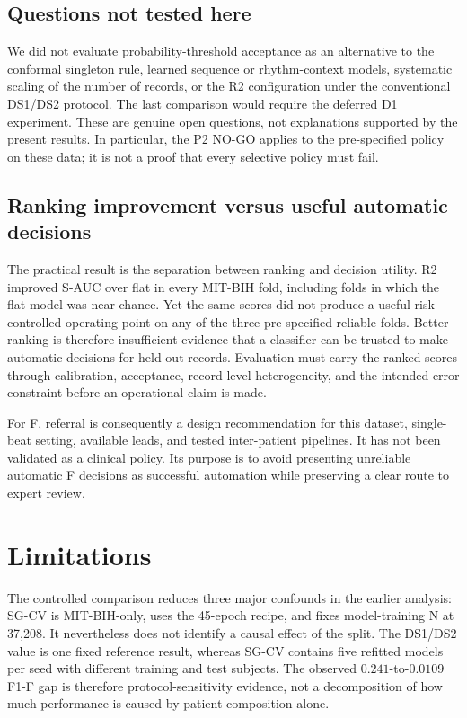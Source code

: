 \documentclass[review,12pt]{elsarticle}
\begin{document}
\subsection{Questions not tested here}
We did not evaluate probability-threshold acceptance as an alternative to the
conformal singleton rule, learned sequence or rhythm-context models, systematic
scaling of the number of records, or the R2 configuration under the conventional
DS1/DS2 protocol. The last comparison would require the deferred D1 experiment.
These are genuine open questions, not explanations supported by the present
results. In particular, the P2 NO-GO applies to the pre-specified policy on
these data; it is not a proof that every selective policy must fail.

\subsection{Ranking improvement versus useful automatic decisions}
The practical result is the separation between ranking and decision utility.
R2 improved S-AUC over flat in every MIT-BIH fold, including folds in which the
flat model was near chance. Yet the same scores did not produce a useful
risk-controlled operating point on any of the three pre-specified reliable
folds. Better ranking is therefore insufficient evidence that a classifier can
be trusted to make automatic decisions for held-out records. Evaluation must
carry the ranked scores through calibration, acceptance, record-level
heterogeneity, and the intended error constraint before an operational claim is
made.

For F, referral is consequently a design recommendation for this dataset,
single-beat setting, available leads, and tested inter-patient pipelines. It
has not been validated as a clinical policy. Its purpose is to avoid
presenting unreliable automatic F decisions as successful automation
while preserving a clear route to expert review.

\section{Limitations}
The controlled comparison reduces three major confounds in the earlier analysis:
SG-CV is MIT-BIH-only, uses the 45-epoch recipe, and fixes model-training N at
37,208. It nevertheless does not identify a causal effect of the split. The
DS1/DS2 value is one fixed reference result, whereas SG-CV contains five refitted
models per seed with different training and test subjects. The observed
$0.241$-to-$0.0109$ F1-F gap is therefore protocol-sensitivity evidence, not a
decomposition of how much performance is caused by patient composition alone.
\end{document}
